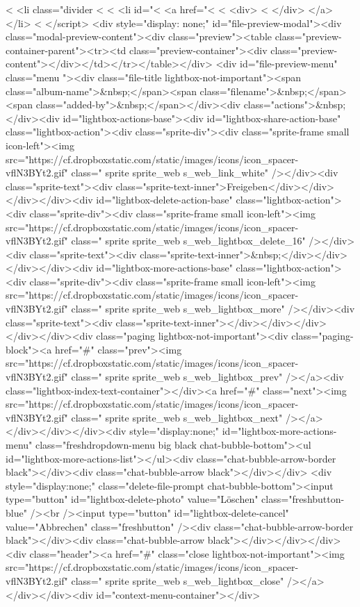 {<%
  <li class="divider <%
<%
  <li id="<%
    <a href="<%
      <%
      <div>
          <%
      </div>
    </a>
  </li>
<%
</script>
<div style="display: none;" id="file-preview-modal"><div class="modal-preview-content"><div class="preview"><table class="preview-container-parent"><tr><td class="preview-container"><div class="preview-content"></div></td></tr></table></div> <div id="file-preview-menu" class="menu "><div class="file-title lightbox-not-important"><span class="album-name">&nbsp;</span><span class="filename">&nbsp;</span><span class="added-by">&nbsp;</span></div><div class="actions">&nbsp;</div><div id="lightbox-actions-base"><div id="lightbox-share-action-base" class="lightbox-action"><div class="sprite-div"><div class="sprite-frame small icon-left"><img src="https://cf.dropboxstatic.com/static/images/icons/icon_spacer-vflN3BYt2.gif" class=" sprite sprite_web s_web_link_white" /></div><div class="sprite-text"><div class="sprite-text-inner">Freigeben</div></div></div></div><div id="lightbox-delete-action-base" class="lightbox-action"><div class="sprite-div"><div class="sprite-frame small icon-left"><img src="https://cf.dropboxstatic.com/static/images/icons/icon_spacer-vflN3BYt2.gif" class=" sprite sprite_web s_web_lightbox_delete_16" /></div><div class="sprite-text"><div class="sprite-text-inner">&nbsp;</div></div></div></div><div id="lightbox-more-actions-base" class="lightbox-action"><div class="sprite-div"><div class="sprite-frame small icon-left"><img src="https://cf.dropboxstatic.com/static/images/icons/icon_spacer-vflN3BYt2.gif" class=" sprite sprite_web s_web_lightbox_more" /></div><div class="sprite-text"><div class="sprite-text-inner"></div></div></div></div></div><div class="paging lightbox-not-important"><div class="paging-block"><a href="#" class="prev"><img src="https://cf.dropboxstatic.com/static/images/icons/icon_spacer-vflN3BYt2.gif" class=" sprite sprite_web s_web_lightbox_prev" /></a><div class="lightbox-index-text-container"></div><a href="#" class="next"><img src="https://cf.dropboxstatic.com/static/images/icons/icon_spacer-vflN3BYt2.gif" class=" sprite sprite_web s_web_lightbox_next" /></a></div></div></div><div style="display:none;" id="lightbox-more-actions-menu" class="freshdropdown-menu big black chat-bubble-bottom"><ul id="lightbox-more-actions-list"></ul><div class="chat-bubble-arrow-border black"></div><div class="chat-bubble-arrow black"></div></div> <div style="display:none;" class="delete-file-prompt chat-bubble-bottom"><input type="button" id="lightbox-delete-photo" value="Löschen" class="freshbutton-blue" /><br /><input type="button" id="lightbox-delete-cancel" value="Abbrechen" class="freshbutton" /><div class="chat-bubble-arrow-border black"></div><div class="chat-bubble-arrow black"></div></div></div><div class="header"><a href="#" class="close lightbox-not-important"><img src="https://cf.dropboxstatic.com/static/images/icons/icon_spacer-vflN3BYt2.gif" class=" sprite sprite_web s_web_lightbox_close" /></a></div></div><div id="context-menu-container"></div>
}
